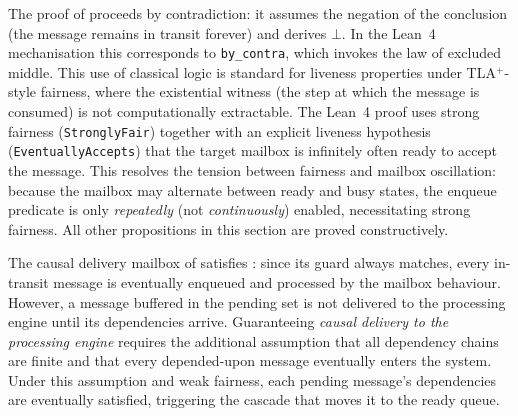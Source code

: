 \documentclass[
  a4paper,        %
  techreport,     %
]{art}
\begin{document}
\begin{remark}\label{rem:classical-reasoning}%
  The proof of  proceeds by contradiction:
  it assumes the negation of the conclusion (the message remains in transit
  forever) and derives $\bot$. In the Lean~4 mechanisation this corresponds
  to \texttt{by\_contra}, which invokes the law of excluded middle.
  This use of classical logic is standard for liveness properties under
  TLA$^{+}$-style fairness, where the existential witness (the step at
  which the message is consumed) is not computationally extractable.
  The Lean~4 proof uses strong fairness (\texttt{StronglyFair}) together
  with an explicit liveness hypothesis (\texttt{EventuallyAccepts}) that
  the target mailbox is infinitely often ready to accept the message.
  This resolves the tension between fairness and mailbox oscillation:
  because the mailbox may alternate between ready and busy states, the
  enqueue predicate is only \emph{repeatedly} (not \emph{continuously})
  enabled, necessitating strong fairness.
  All other propositions in this section are proved constructively.
\end{remark}

\begin{remark}\label{rem:causal-delivery}%
  The causal delivery mailbox of  satisfies
  : since its guard always matches, every
  in-transit message is eventually enqueued and processed by the mailbox
  behaviour. However, a message buffered in the pending set is not delivered
  to the processing engine until its dependencies arrive. Guaranteeing
  \emph{causal delivery to the processing engine} requires the additional
  assumption that all dependency chains are finite and that every depended-upon
  message eventually enters the system. Under this assumption and weak
  fairness, each pending message's dependencies are eventually satisfied,
  triggering the cascade that moves it to the ready queue.
\end{remark}
\end{document}
